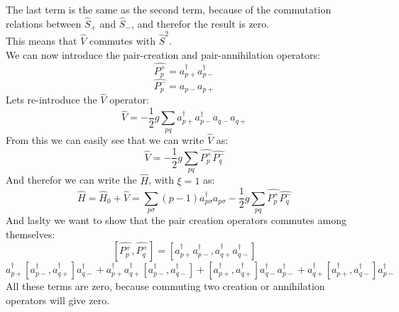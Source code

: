 \documentclass[a4paper,12pt]{article}
\begin{document}
The last term is the same as the second term, because of the commutation relations between $\hat{S}_+$ and $\hat{S}_-$, and therefor the result is zero.\\
This means that $\hat{V}$ commutes with $\hat{S}^2$.\\
We can now introduce the pair-creation and pair-annihilation operators:
$$\hat{ P_p^+} = a_{p+}^{†} a_{p-}^{†}$$
$$\hat{ P_p^-} = a_{p-} a_{p+}$$
Lets re-introduce the $\hat{V}$ operator:
$$\hat{ V} = -\frac{1}{2} g ∑_{pq}^{} a_{p+}^{†} a_{p-}^{†}a_{q-} a_{q+}$$
From this we can easily see that we can write $\hat{V}$ as:
$$\hat{ V} = -\frac{1}{2} g ∑_{pq}^{} \hat{P_p^+} \hat{P_q^-}$$
And therefor we can write the $\hat{H}$, with $\xi=1$ as:
$$\hat{ H} = \hat{H}_0 + \hat{V} = ∑_{ p σ }^{} (p-1)a_{p σ}^{†}a_{p σ} -\frac{1}{2} g ∑_{pq}^{} \hat{P_p^+} \hat{P_q^-}$$
And laslty we want to show that the pair creation operators commutes among themselves:
$$[\hat{P_p^+},\hat{P_q^+}] = [a_{p+}^{†} a_{p-}^{†}, a_{q+}^{†} a_{q-}^{†}]$$ 
$$
a_{p+}^{†} [a_{p-}^{†}, a_{q+}^{†}] a_{q-}^{†} + a_{p+}^{†} a_{q+}^{†} [a_{p-}^{†}, a_{q-}^{†}]
+ [a_{p+}^{†}, a_{q+}^{†}] a_{q-}^{†} a_{p-}^{†} + a_{q+}^{†} [a_{p+}^{†}, a_{q-}^{†}] a_{p-}^{†}
$$
All these terms are zero, because commuting two creation or annihilation operators will give zero.\\
\end{document}
